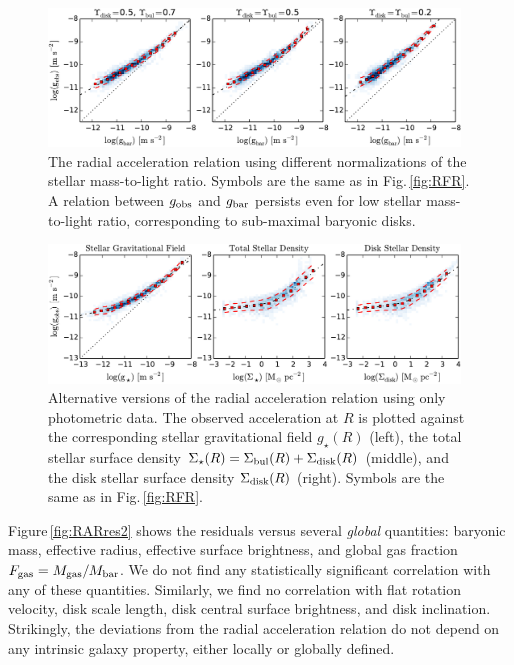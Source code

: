 \documentclass[apjl, twocolappendix]{emulateapj}
\begin{document}
\begin{figure}[thb]
\centering
\includegraphics[width=0.975\textwidth]{RAR_ML.pdf}
\caption{The radial acceleration relation using different normalizations of the stellar mass-to-light ratio. Symbols are the same as in Fig.\,\ref{fig:RFR}. A relation between $g_{\rm obs}$ and $g_{\rm bar}$ persists even for low stellar mass-to-light ratio, corresponding to sub-maximal baryonic disks.}
\label{fig:ML}
\end{figure}
\begin{figure}[thb]
\centering
\includegraphics[width=0.975\textwidth]{RAR_Alt.pdf}
\caption{Alternative versions of the radial acceleration relation using only photometric data. The observed acceleration at $R$ is plotted against the corresponding stellar gravitational field $g_{\star}(R)$ (left), the total stellar surface density $\Sigma_{\star}(R) = \Sigma_{\rm bul}(R) +\Sigma_{\rm disk}(R)$ (middle), and the disk stellar surface density $\Sigma_{\rm disk}(R)$ (right). Symbols are the same as in Fig.\,\ref{fig:RFR}.}
\label{fig:Alt}
\end{figure}

Figure\,\ref{fig:RARres2} shows the residuals versus several \textit{global} quantities: baryonic mass, effective radius, effective surface brightness, and global gas fraction $F_{\rm gas} = M_{\rm gas}/M_{\rm bar}$. We do not find any statistically significant correlation with any of these quantities. Similarly, we find no correlation with flat rotation velocity, disk scale length, disk central surface brightness, and disk inclination. Strikingly, the deviations from the radial acceleration relation do not depend on any intrinsic galaxy property, either locally or globally defined.
\end{document}

